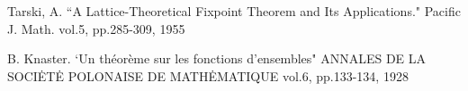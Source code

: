 \documentclass[a4j, 10pt]{jarticle}
\begin{document}
    \begin{thebibliography}{99}
         Tarski, A.
            ``A Lattice-Theoretical Fixpoint Theorem and Its Applications."
            Pacific J. Math. vol.5, pp.285-309, 1955

         B. Knaster.
            `Un théorème sur les fonctions d'ensembles"
            ANNALES DE LA SOCI\.{E}T\.{E} POLONAISE DE MATH\.{E}MATIQUE
            vol.6, pp.133-134, 1928
    \end{thebibliography}
\end{document}

